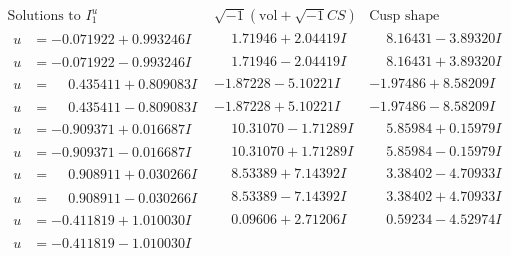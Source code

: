 \documentclass[1p]{elsarticle_modified}
\theoremstyle{definition}
\newcommand{\I}{\sqrt{-1}}
\begin{document}
$$\begin{array}{c|c|c}  
\text{Solutions to }I^u_{1}& \I (\text{vol} + \sqrt{-1}CS) & \text{Cusp shape}\\
 \hline 
\begin{aligned}
u &= -0.071922 + 0.993246 I\end{aligned}
 & \phantom{-}1.71946 + 2.04419 I & \phantom{-}8.16431 - 3.89320 I \\ \hline\begin{aligned}
u &= -0.071922 - 0.993246 I\end{aligned}
 & \phantom{-}1.71946 - 2.04419 I & \phantom{-}8.16431 + 3.89320 I \\ \hline\begin{aligned}
u &= \phantom{-}0.435411 + 0.809083 I\end{aligned}
 & -1.87228 - 5.10221 I & -1.97486 + 8.58209 I \\ \hline\begin{aligned}
u &= \phantom{-}0.435411 - 0.809083 I\end{aligned}
 & -1.87228 + 5.10221 I & -1.97486 - 8.58209 I \\ \hline\begin{aligned}
u &= -0.909371 + 0.016687 I\end{aligned}
 & \phantom{-}10.31070 - 1.71289 I & \phantom{-}5.85984 + 0.15979 I \\ \hline\begin{aligned}
u &= -0.909371 - 0.016687 I\end{aligned}
 & \phantom{-}10.31070 + 1.71289 I & \phantom{-}5.85984 - 0.15979 I \\ \hline\begin{aligned}
u &= \phantom{-}0.908911 + 0.030266 I\end{aligned}
 & \phantom{-}8.53389 + 7.14392 I & \phantom{-}3.38402 - 4.70933 I \\ \hline\begin{aligned}
u &= \phantom{-}0.908911 - 0.030266 I\end{aligned}
 & \phantom{-}8.53389 - 7.14392 I & \phantom{-}3.38402 + 4.70933 I \\ \hline\begin{aligned}
u &= -0.411819 + 1.010030 I\end{aligned}
 & \phantom{-}0.09606 + 2.71206 I & \phantom{-}0.59234 - 4.52974 I \\ \hline\begin{aligned}
u &= -0.411819 - 1.010030 I\end{aligned}

\end{array}$$
\end{document}
